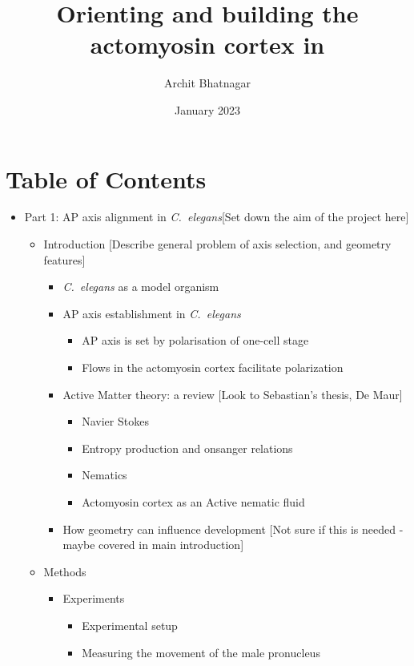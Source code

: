 \documentclass{article}
\title{Orienting and building the actomyosin cortex in \Ce}
\author{Archit Bhatnagar}
\date{January 2023}
\newcommand{\Ce}{\textit{C.~elegans}\xspace}
\begin{document}
\maketitle 

\section*{Table of Contents}

\begin{itemize}
    \item Part 1: AP axis alignment in \Ce [Set down the aim of the project here]
    \begin{itemize}
    \item Introduction [Describe general problem of axis selection, and geometry features]
    \begin{itemize}
            \item \Ce as a model organism
            \item AP axis establishment in \Ce
            \begin{itemize}
                \item AP axis is set by polarisation of one-cell stage
                \item Flows in the actomyosin cortex facilitate polarization
            \end{itemize}
            \item Active Matter theory: a review [Look to Sebastian's thesis, De Maur]
            \begin{itemize}
                \item Navier Stokes
                \item Entropy production and onsanger relations
                \item Nematics
                \item Actomyosin cortex as an Active nematic fluid
            \end{itemize}
            \item How geometry can influence development [Not sure if this is needed - maybe covered in main introduction]
        \end{itemize}
    \item Methods
    \begin{itemize}
        \item Experiments
        \begin{itemize}
            \item Experimental setup
            \item Measuring the movement of the male pronucleus

\end{itemize}
\end{itemize}
\end{itemize}
\end{itemize}
\end{document}
